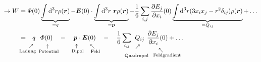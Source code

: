 \begin{align*}
\rightarrow W &= \Phi(0)\underbrace{\int\dd^3r\rho(\vec{r})}_{=q}-\vec{E}(0)\cdot\underbrace{\int\dd^3r \ \vec{r}\rho(\vec{r})}_{=\vec{p}}-\frac{1}{6}\sum_{i,j}\frac{\partial E_j}{\partial x_i}(0)\underbrace{\int\dd^3r(3x_ix_j-r^2\delta_{ij})\rho(\vec{r})}_{=Q_{ij}}+\ldots \\
&= \custo{\substack{\vspace{10pt}\\ \nwarrow} }{q}{\mathclap{\tx{Ladung}}\qquad} \custo{\substack{\leftarrow}}{\Phi(0)}{\ \ \mathclap{\tx{Potential}}} \quad - \quad \custo{\substack{\leftarrow}}{\vec{p}}{\ \ \mathclap{\tx{Dipol}}} \cdot \custo{\substack{\swarrow\\ \vspace{5pt}}}{\vec{E}(0)}{\qquad \mathclap{\tx{Feld}}} \quad - \quad \frac{1}{6} \sum_{i,j} 
\ \custo{\substack{\vspace{7pt} \\ \nwarrow}}{Q_{ij}}{\mathclap{\substack{\\[5pt]\tx{Quadrupol}}} \quad} \  \custo{\substack{\swarrow \\ \vspace{5pt}}}{\frac{\partial E_j}{\partial x_i} (0)}{\qquad \quad \mathclap{\tx{Feldgradient}}} + \ldots
\end{align*}

